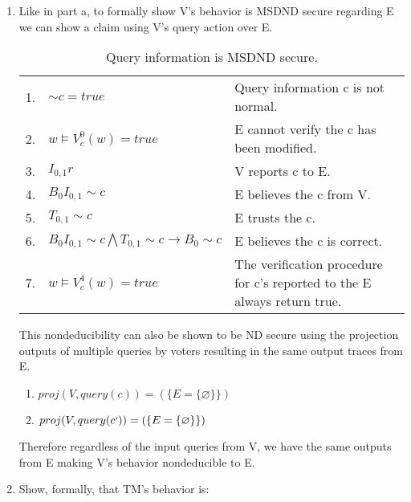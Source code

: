 \documentclass[journal,onecolumn]{IEEEtran}
\begin{document}
\begin{enumerate}
\begin{enumerate}
      \item Like in part a, to formally show V's behavior is MSDND secure regarding E we can show a claim using V's query action over E.  
      
      \begin{table}[H]
        \caption{Query information is MSDND secure.}
        \centering
        \begin{tabular}{lll}
        1.  & ${\sim} c = true$           & Query information c is not normal.                                                       \\
        2.  & $w \vDash V^0_c(w) = true$  & E cannot verify the c has been modified.                                 \\
        3.  & $I_{0,1}r$                  & V reports c to E.                                                \\
        4.  & $B_0I_{0,1} {\sim} c$       & E believes the c from V.                                     \\
        5.  & $T_{0,1} {\sim} c$          & E trusts the c.                                                          \\
        6.  & $B_0I_{0,1} {\sim} c \bigwedge T_{0,1} {\sim} c \rightarrow B_0 {\sim} c$ & E believes the c is correct.                                             \\
        7.  & $w \vDash V^4_c(w) = true$   & The verification procedure for c's reported to the E always return true.
        \end{tabular}
      \end{table}
      
      This nondeducibility can also be shown to be ND secure using the projection outputs of multiple queries by voters resulting in the same output traces from E. \\

      \begin{enumerate}
        \item $proj(V, query(c)) = (\{E = \{\varnothing\}\})$       
        \item $proj(V, query(c`)) = (\{E = \{\varnothing\}\})$
      \end{enumerate}

      Therefore regardless of the input queries from V, we have the same outputs from E making V's behavior nondeducible to E.

      \item Show, formally, that TM's behavior is:
      

\end{enumerate}
\end{enumerate}
\end{document}
